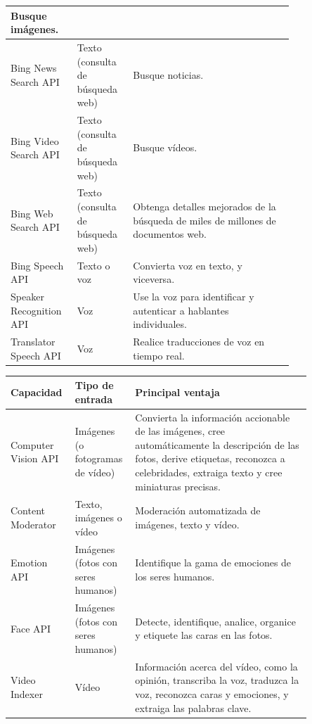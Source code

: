 \begin{table}[]
\begin{tabular}{| p{0.15\linewidth} | p{0.15\linewidth} | p{0.5\linewidth} |}
  Busque imágenes. \\ \hline
Bing News Search API &
  Texto (consulta de búsqueda web) &
  Busque noticias. \\ \hline
Bing Video Search API &
  Texto (consulta de búsqueda web) &
  Busque vídeos. \\ \hline
Bing Web Search API &
  Texto (consulta de búsqueda web) &
  Obtenga detalles mejorados de la búsqueda de miles de millones de documentos web. \\ \hline
Bing Speech API &
  Texto o voz &
  Convierta voz en texto, y viceversa. \\ \hline
Speaker Recognition API &
  Voz &
  Use la voz para identificar y autenticar a hablantes individuales. \\ \hline
Translator Speech API &
  Voz &
  Realice traducciones de voz en tiempo real. \\ \hline
\end{tabular}
\end{table}

\begin{table}[]
\begin{tabular}{| p{0.15\linewidth} | p{0.15\linewidth} | p{0.55\linewidth} |}
\hline
\textbf{Capacidad} &
  \textbf{Tipo de entrada} &
  \textbf{Principal ventaja} \\ \hline
Computer Vision API &
  Imágenes (o fotogramas de vídeo) &
  Convierta la información accionable de las imágenes, cree automáticamente la descripción de las fotos, derive etiquetas, reconozca a celebridades, extraiga texto y cree miniaturas precisas. \\ \hline
Content Moderator &
  Texto, imágenes o vídeo &
  Moderación automatizada de imágenes, texto y vídeo. \\ \hline
Emotion API &
  Imágenes (fotos con seres humanos) &
  Identifique la gama de emociones de los seres humanos. \\ \hline
Face API &
  Imágenes (fotos con seres humanos) &
  Detecte, identifique, analice, organice y etiquete las caras en las fotos. \\ \hline
Video Indexer &
  Vídeo &
  Información acerca del vídeo, como la opinión, transcriba la voz, traduzca la voz, reconozca caras y emociones, y extraiga las palabras clave. \\ \hline
\end{tabular}
\end{table}